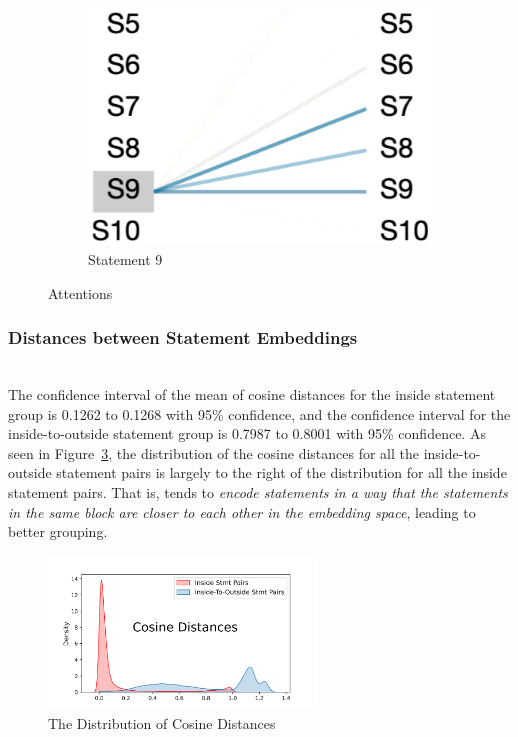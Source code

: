 \begin{figure}
\begin{subfigure}[b]{0.15\textwidth}
         \includegraphics[width=\textwidth]{sec9-fig3.png}
         \caption{Statement 9}
         \label{fig:stmt-9}
     \end{subfigure}
        \caption{Attentions}
        \label{fig:rq4-attention}
\end{figure}


\subsubsection{Distances between Statement Embeddings}~\\
The confidence interval of the mean of cosine distances for the inside
statement group is 0.1262 to 0.1268 with 95\% confidence, and the
confidence interval for the inside-to-outside statement group is
0.7987 to 0.8001 with 95\% confidence. As seen in
Figure~\ref{fig:rq4-density}, the distribution of the cosine distances
for all the inside-to-outside statement pairs is largely to the right
of the distribution for all the inside statement pairs. That is,
{\tool} tends to {\em encode statements in a way that the statements
  in the same  block are closer to each other in the
  embedding space}, leading to better grouping.
  
\begin{figure}[t]
 	\centering
 	\includegraphics[width=2.8in]{rq4-density-v2.png}
        \vspace{-12pt}
 	\caption{The Distribution of Cosine Distances}
 	\label{fig:rq4-density}	
\end{figure}




